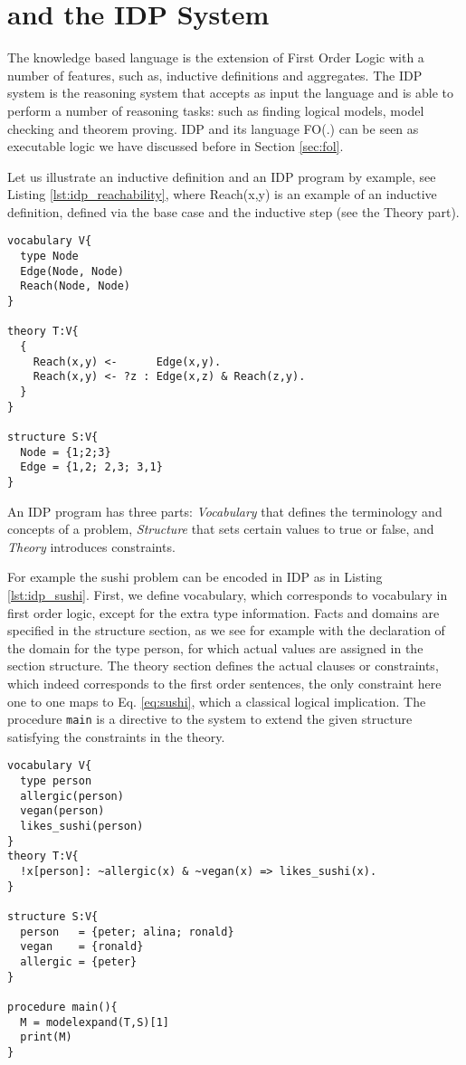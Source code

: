 \section{\fod and the IDP System}
The knowledge based language \fod is the extension of First Order Logic with a number of features, such as, inductive definitions and aggregates. The IDP system \parencite{idppaper} is the reasoning system that accepts as input the \fod language and is able to perform a number of reasoning tasks: such as finding logical models, model checking and theorem proving. IDP and its language FO(.) can be seen as executable logic we have discussed before in Section \ref{sec:fol}. 

Let us illustrate an inductive definition and an IDP program by example, see Listing \ref{lst:idp_reachability}, where Reach(x,y) is an example of an inductive definition, defined via the base case and the inductive step (see the Theory part).
\begin{lstlisting}[caption=An example of an inductive definition in FO(.) and of an IDP program,label=lst:idp_reachability]
vocabulary V{
  type Node
  Edge(Node, Node)
  Reach(Node, Node)
}

theory T:V{
  { 
    Reach(x,y) <-      Edge(x,y).
    Reach(x,y) <- ?z : Edge(x,z) & Reach(z,y).
  }
}

structure S:V{
  Node = {1;2;3}
  Edge = {1,2; 2,3; 3,1} 
}
\end{lstlisting}

An IDP program has three parts: \textit{Vocabulary} that defines the terminology and concepts of a problem, \textit{Structure} that sets certain values to true or false, and \textit{Theory} introduces constraints.

For example the sushi problem can be encoded in IDP as in Listing \ref{lst:idp_sushi}. First, we define vocabulary, which corresponds to vocabulary in first order logic, except for the extra type information. Facts and domains are specified in the structure section, as we see for example with the declaration of the domain for the type person, for which actual values are assigned in the section structure. The theory section defines the actual clauses or constraints, which indeed corresponds to the first order sentences, the only constraint here one to one maps to Eq. \ref{eq:sushi}, which a classical logical implication. The procedure \texttt{main} is a directive to the system to extend the given structure satisfying the constraints in the theory.

\begin{minipage}{\linewidth}
\begin{lstlisting}[caption=Encoding sushi preferences problem, label=lst:idp_sushi,basicstyle=\ttfamily, basicstyle=\small]
vocabulary V{
  type person
  allergic(person)
  vegan(person)
  likes_sushi(person)
}
theory T:V{
  !x[person]: ~allergic(x) & ~vegan(x) => likes_sushi(x).
}

structure S:V{
  person   = {peter; alina; ronald}
  vegan    = {ronald}
  allergic = {peter}
}

procedure main(){
  M = modelexpand(T,S)[1]
  print(M)
}
\end{lstlisting}
\end{minipage}

